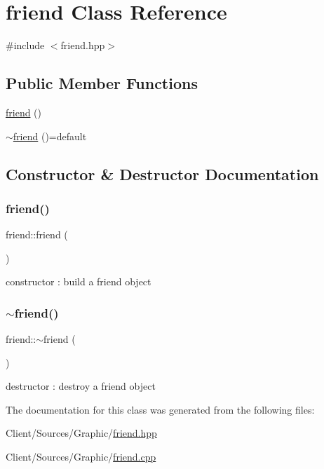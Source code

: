 \hypertarget{classfriend}{}\section{friend Class Reference}
\label{classfriend}


{\ttfamily \#include $<$friend.\+hpp$>$}

\subsection*{Public Member Functions}
\begin{DoxyCompactItemize}
\item 
\hyperlink{classfriend_aa1e54798f29b7ed4c3b8e62388c87d89}{friend} ()
\item 
\hyperlink{classfriend_a20e8582e14237eb045455cc4200df3d6}{$\sim$friend} ()=default
\end{DoxyCompactItemize}


\subsection{Constructor \& Destructor Documentation}
\mbox{\label{classfriend_aa1e54798f29b7ed4c3b8e62388c87d89}} 
\subsubsection{\texorpdfstring{friend()}{friend()}}
{\footnotesize\ttfamily friend\+::friend (\begin{DoxyParamCaption}{ }\end{DoxyParamCaption})}

constructor \+: build a friend object \mbox{\label{classfriend_a20e8582e14237eb045455cc4200df3d6}} 
\subsubsection{\texorpdfstring{$\sim$friend()}{~friend()}}
{\footnotesize\ttfamily friend\+::$\sim$friend (\begin{DoxyParamCaption}{ }\end{DoxyParamCaption})\hspace{0.3cm}{\ttfamily [default]}}

destructor \+: destroy a friend object 

The documentation for this class was generated from the following files\+:\begin{DoxyCompactItemize}
\item 
Client/\+Sources/\+Graphic/\hyperlink{friend_8hpp}{friend.\+hpp}\item 
Client/\+Sources/\+Graphic/\hyperlink{friend_8cpp}{friend.\+cpp}\end{DoxyCompactItemize}
